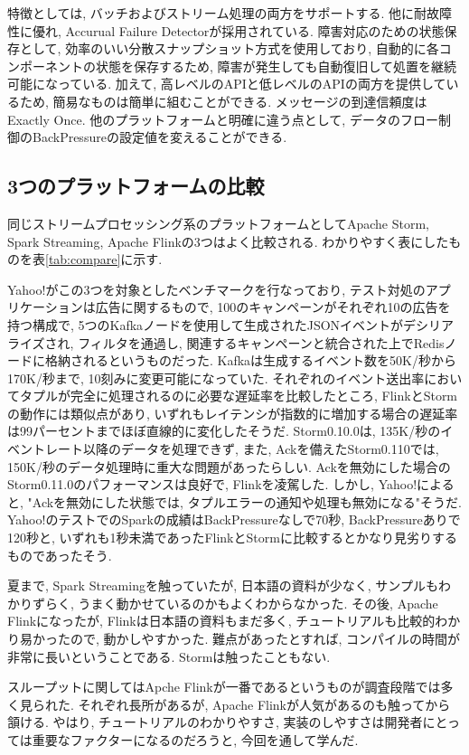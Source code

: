 \documentclass[11pt]{jreport}
\begin{document}
特徴としては, バッチおよびストリーム処理の両方をサポートする. 他に耐故障性に優れ, Accurual Failure Detectorが採用されている. 
障害対応のための状態保存として, 効率のいい分散スナップショット方式を使用しており, 自動的に各コンポーネントの状態を保存するため, 障害が発生しても自動復旧して処置を継続可能になっている. \cite{qiita_stream_2}
加えて, 高レベルのAPIと低レベルのAPIの両方を提供しているため, 簡易なものは簡単に組むことができる. 
メッセージの到達信頼度はExactly Once. \cite{slide_flink}
他のプラットフォームと明確に違う点として, データのフロー制御のBackPressureの設定値を変えることができる.

\subsection{3つのプラットフォームの比較}
同じストリームプロセッシング系のプラットフォームとしてApache Storm, Spark Streaming, Apache Flinkの3つはよく比較される. わかりやすく表にしたものを表\ref{tab:compare}に示す.

Yahoo!がこの3つを対象としたベンチマークを行なっており, テスト対処のアプリケーションは広告に関するもので, 100のキャンペーンがそれぞれ10の広告を持つ構成で, 5つのKafkaノードを使用して生成されたJSONイベントがデシリアライズされ, フィルタを通過し, 関連するキャンペーンと統合された上でRedisノードに格納されるというものだった. 
Kafkaは生成するイベント数を50K/秒から170K/秒まで, 10刻みに変更可能になっていた. 
それぞれのイベント送出率においてタプルが完全に処理されるのに必要な遅延率を比較したところ,  FlinkとStormの動作には類似点があり, いずれもレイテンシが指数的に増加する場合の遅延率は99パーセントまでほぼ直線的に変化したそうだ. 
Storm0.10.0は, 135K/秒のイベントレート以降のデータを処理できず, また, Ackを備えたStorm0.110では, 150K/秒のデータ処理時に重大な問題があったらしい. 
Ackを無効にした場合のStorm0.11.0のパフォーマンスは良好で, Flinkを凌駕した. しかし, Yahoo!によると, "Ackを無効にした状態では, タプルエラーの通知や処理も無効になる"そうだ. 
Yahoo!のテストでのSparkの成績はBackPressureなしで70秒, BackPressureありで120秒と, いずれも1秒未満であったFlinkとStormに比較するとかなり見劣りするものであったそう. \cite{infoq}

夏まで, Spark Streamingを触っていたが, 日本語の資料が少なく, サンプルもわかりずらく, うまく動かせているのかもよくわからなかった. その後, Apache Flinkになったが, Flinkは日本語の資料もまだ多く, チュートリアルも比較的わかり易かったので, 動かしやすかった. 難点があったとすれば, コンパイルの時間が非常に長いということである. Stormは触ったこともない.

スループットに関してはApche Flinkが一番であるというものが調査段階では多く見られた. 
それぞれ長所があるが, Apache Flinkが人気があるのも触ってから頷ける. 
やはり, チュートリアルのわかりやすさ, 実装のしやすさは開発者にとっては重要なファクターになるのだろうと, 今回を通して学んだ. 
\end{document}
